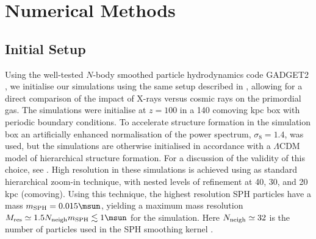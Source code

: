 \section{Numerical Methods}
\label{methods}

\subsection{Initial Setup}
\label{setup}

Using the well-tested $N$-body smoothed particle hydrodynamics code GADGET2 \citep{Springel2005}, we initialise our simulations using the same setup described in \citet{Hummeletal2014}, allowing for a direct comparison of the impact of X-rays versus cosmic rays on the primordial gas.  The simulations were initialise at $z=100$ in a 140 comoving kpc box with periodic boundary conditions. To accelerate structure formation in the simulation box an artificially enhanced normalisation of the power spectrum, $\sigma_8 = 1.4$, was used, but the simulations are otherwise initialised in accordance with a $\Lambda$CDM model of hierarchical structure formation. For a discussion of the validity of this choice, see \citet{StacyGreifBromm2010}. High resolution in these simulations is achieved using as standard hierarchical zoom-in technique, with nested levels of refinement at 40, 30, and 20 kpc (comoving).  Using this technique, the highest resolution SPH particles have a mass $m_{\rm SPH} = 0.015\msun$, yielding a maximum mass resolution $M_{\rm res} \simeq 1.5 N_{\rm neigh} m_{\rm SPH} \lesssim 1\msun$ for the simulation.  Here $N_{\rm neigh} \simeq 32$ is the number of particles used in the SPH smoothing kernel \citep{BateBurkert1997}.
